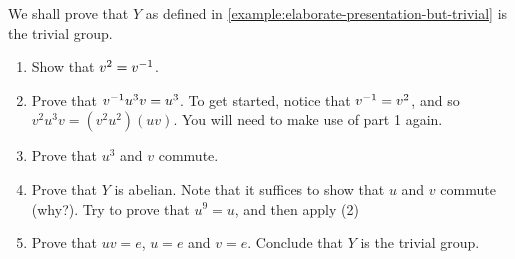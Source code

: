 \documentclass[./main.tex]{subfiles}
\begin{document}
\begin{exercise}
\label{ex:elaborate-presentation-but-trivial}
    We shall prove that $Y$ as defined in \cref{example:elaborate-presentation-but-trivial} is the trivial group.
    \begin{enumerate}
        \item Show that $v^2 = v^{-1}$.
        \item Prove that $v^{-1} u^3 v = u^3$. To get started, notice that $v^{-1}
        = v^2$, and so $v^2 u^3 v = (v^2 u^2) (uv)$. You will need to make use of part 1 again.
        \item Prove that $u^3$ and $v$ commute.
        \item Prove that $Y$ is abelian. Note that it suffices to show that $u$
        and $v$ commute (why?). Try to prove that $u^9 = u$, and then apply (2)
        \item Prove that $uv=e$, $u=e$ and $v=e$. Conclude that $Y$ is the
        trivial group.
    \end{enumerate}
\end{exercise}
\end{document}
